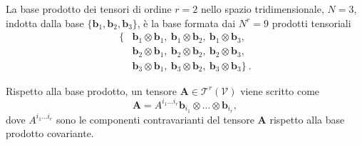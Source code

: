 \begin{example}
 La base prodotto dei tensori di ordine $r=2$ nello spazio tridimensionale, $N=3$, indotta dalla base $\{ \bm{b}_1, \bm{b}_2, \bm{b}_3 \}$, è la base formata dai $N^r = 9$ prodotti tensoriali
\begin{equation}
\begin{aligned}
 \{ & \bm{b}_1 \otimes \bm{b}_1 , \  \bm{b}_1 \otimes \bm{b}_2 , \  \bm{b}_1 \otimes \bm{b}_3 , \\
    & \bm{b}_2 \otimes \bm{b}_1 , \  \bm{b}_2 \otimes \bm{b}_2 , \  \bm{b}_2 \otimes \bm{b}_3 , \\
    & \bm{b}_3 \otimes \bm{b}_1 , \  \bm{b}_3 \otimes \bm{b}_2 , \  \bm{b}_3 \otimes \bm{b}_3  \} \ .
\end{aligned}
\end{equation}
\end{example}

\noindent
 Rispetto alla base prodotto, un tensore $\bm{A} \in \mathcal{T}^r(\mathcal{V})$ viene scritto come
 \begin{equation}
  \bm{A} = A^{i_1 \dots i_r} \bm{b}_{i_1} \otimes \dots \otimes \bm{b}_{i_r} ,
 \end{equation}
 dove $A^{i_1 \dots i_r}$ sono le componenti contravarianti del tensore $\bm{A}$ rispetto alla base prodotto covariante.

